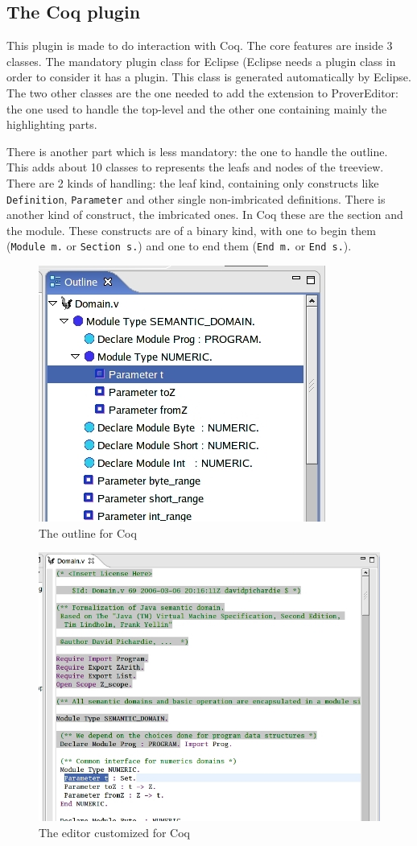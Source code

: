 \documentclass{entcs}
\begin{document}
\subsection{The Coq plugin}
\label{subsec:coq-plugin}

This plugin is made to do interaction with Coq. The core features
are inside 3 classes. The mandatory plugin class for Eclipse (Eclipse
needs a plugin class in order to consider it has a plugin. This class
is generated automatically by Eclipse. The two other classes are the one
needed to add the extension to ProverEditor: the one used to handle the
top-level and the other one containing mainly the highlighting parts.

There is another part which is less mandatory: the one to handle the outline.
This adds about 10 classes to represents the leafs and nodes of the treeview.
There are 2 kinds of handling: the leaf kind, containing only constructs
like {\tt Definition}, {\tt Parameter} and other single non-imbricated
definitions. There is another kind of construct, the imbricated ones.
In Coq these are the section and the module. These constructs are of
a binary kind, with one to begin them ({\tt Module m.} or {\tt Section s.})
and one to end them ({\tt End m.} or {\tt End s.}).\\

\begin{figure}
\begin{center}
\includegraphics[width=0.5\linewidth]{coqoutline}
\end{center}
  \caption{The outline for Coq}
  \label{outline}
\end{figure}
\begin{figure}
\begin{center}
\includegraphics[width=0.6\linewidth]{coqeditor}
\end{center}
  \caption{The editor customized for Coq}
  \label{editor}
\end{figure}
\end{document}
